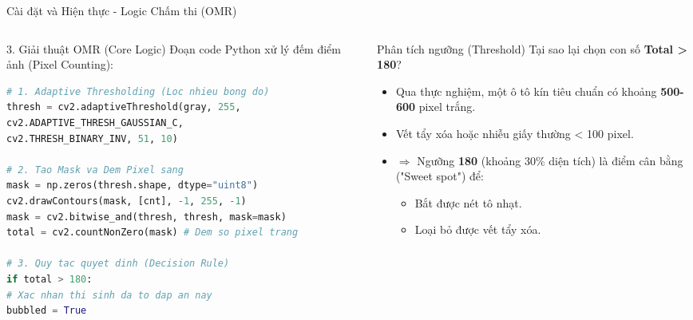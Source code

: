 \documentclass[10pt, aspectratio=169]{beamer}
\begin{document}
\begin{frame}[fragile]{Cài đặt và Hiện thực - Logic Chấm thi (OMR)}
	
	\begin{columns}
		\begin{column}{0.6\textwidth}
			\begin{exampleblock}{3. Giải thuật OMR (Core Logic)}
				Đoạn code Python xử lý đếm điểm ảnh (Pixel Counting):
				
			\begin{lstlisting}[language=Python, basicstyle=\ttfamily\footnotesize, keywordstyle=\color{blue}]
# 1. Adaptive Thresholding (Loc nhieu bong do)
thresh = cv2.adaptiveThreshold(gray, 255, 
cv2.ADAPTIVE_THRESH_GAUSSIAN_C, 
cv2.THRESH_BINARY_INV, 51, 10)

# 2. Tao Mask va Dem Pixel sang
mask = np.zeros(thresh.shape, dtype="uint8")
cv2.drawContours(mask, [cnt], -1, 255, -1)
mask = cv2.bitwise_and(thresh, thresh, mask=mask)
total = cv2.countNonZero(mask) # Dem so pixel trang

# 3. Quy tac quyet dinh (Decision Rule)
if total > 180:
# Xac nhan thi sinh da to dap an nay
bubbled = True
				\end{lstlisting}
			\end{exampleblock}
		\end{column}
		
		\begin{column}{0.38\textwidth}
			\begin{alertblock}{Phân tích ngưỡng (Threshold)}
				Tại sao lại chọn con số \textbf{Total > 180}?
				\vspace{0.5em}
				\begin{itemize}
					\item Qua thực nghiệm, một ô tô kín tiêu chuẩn có khoảng \textbf{500-600} pixel trắng.
					\item Vết tẩy xóa hoặc nhiễu giấy thường < 100 pixel.
					\item $\Rightarrow$ Ngưỡng \textbf{180} (khoảng 30\% diện tích) là điểm cân bằng ("Sweet spot") để:
					\begin{itemize} \footnotesize
						\item Bắt được nét tô nhạt.
						\item Loại bỏ được vết tẩy xóa.
					\end{itemize}
				\end{itemize}
			\end{alertblock}
		\end{column}
	\end{columns}
	
\end{frame}
\end{document}
